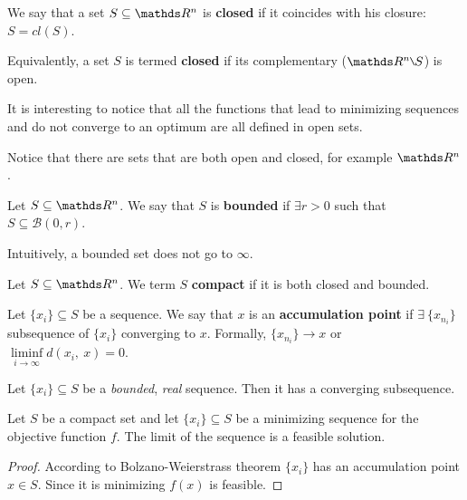 \documentclass[computationalMathematics.tex]{subfiles}
\begin{document}
\begin{definition}
  We say that a set $S \subseteq \R^n$ is \textbf{closed} if it coincides with his closure: $S=cl(S)$.

  Equivalently, a set $S$ is termed \textbf{closed} if its complementary ($\R^n \setminus S$) is open.
\end{definition}

It is interesting to notice that all the functions that lead to minimizing sequences and do not converge to an optimum are all defined in open sets.

Notice that there are sets that are both open and closed, for example $\R^n$.

\begin{definition}
  Let $S \subseteq \R^n$. We say that $S$ is \textbf{bounded} if $\exists r > 0$ such that $S \subseteq \mathcal{B}(0,r)$.
  
  Intuitively, a bounded set does not go to $\infty$.
\end{definition}

\begin{definition}
 Let $S \subseteq \R^n$. We term $S$ \textbf{compact} if it is both closed and bounded.
\end{definition}

\begin{definition}
  Let $\{x_i\} \subseteq S$ be a sequence. We say that $x$ is an \textbf{accumulation point} if $\exists~\{x_{n_i}\}$ subsequence of $\{x_i\}$ converging to $x$.
  Formally, $\{x_{n_i}\} \to x$ or $\liminf\limits_{i \to \infty} d(x_i,~x) = 0$.
\end{definition}

\begin{theorem}
	Let $\{x_i\} \subseteq S$ be a \emph{bounded}, \emph{real} sequence.
	Then it has a converging subsequence.	
\end{theorem}

\begin{proposition}
  Let $S$ be a compact set and let $\{x_i\} \subseteq S$ be a minimizing sequence for the objective function $f$. 
  The limit of the sequence is a feasible solution.
\end{proposition}

\begin{proof}
	According to Bolzano-Weierstrass theorem $\{x_i\}$ has an accumulation point $x \in S$.
	Since it is minimizing $f(x)$ is feasible.
\end{proof}
\end{document}
